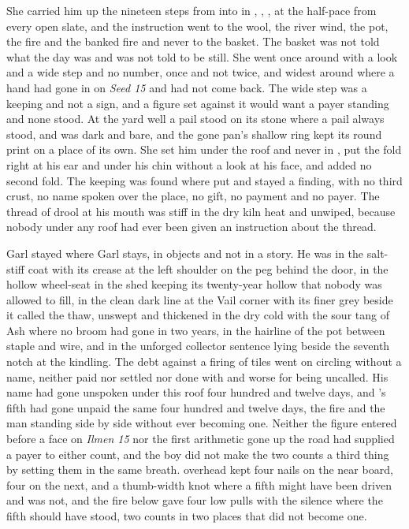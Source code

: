 She carried him up the nineteen steps from  into  in , , , at the half-pace from every open slate, and the instruction went to the wool, the river wind, the pot, the fire and the banked fire and never to the basket. The basket was not told what the day was and was not told to be still. She went once around  with a look and a wide step and no number, once and not twice, and widest around  where a hand had gone in on \emph{Seed 15} and had not come back. The wide step was a keeping and not a sign, and a figure set against it would want a payer standing and none stood. At the yard well a pail stood on its stone where a pail always stood, and  was dark and bare, and the gone pan's shallow ring kept its round print on a place of its own. She set him under the roof and never in , put the fold right at his ear and under his chin without a look at his face, and added no second fold. The keeping was found where put and stayed a finding, with no third crust, no name spoken over the place, no gift, no payment and no payer. The thread of drool at his mouth was stiff in the dry kiln heat and unwiped, because nobody under any roof had ever been given an instruction about the thread.

Garl stayed where Garl stays, in objects and not in a story. He was in the salt-stiff coat with its crease at the left shoulder on the peg behind the door, in the hollow wheel-seat in the shed keeping its twenty-year hollow that nobody was allowed to fill, in the clean dark line at the Vail corner with its finer grey beside it called the thaw, unswept and thickened in the dry cold with the sour tang of Ash where no broom had gone in two years, in the hairline of the pot between staple and wire, and in the unforged collector sentence lying beside the seventh notch at the kindling. The debt against a firing of tiles went on circling without a name, neither paid nor settled nor done with and worse for being uncalled. His name had gone unspoken under this roof four hundred and twelve days, and 's fifth had gone unpaid the same four hundred and twelve days, the fire and the man standing side by side without ever becoming one. Neither the figure entered before a face on \emph{Ilmen 15} nor the first arithmetic gone up the road had supplied a payer to either count, and the boy did not make the two counts a third thing by setting them in the same breath.  overhead kept four nails on the near board, four on the next, and a thumb-width knot where a fifth might have been driven and was not, and the fire below gave four low pulls with the silence where the fifth should have stood, two counts in two places that did not become one.

